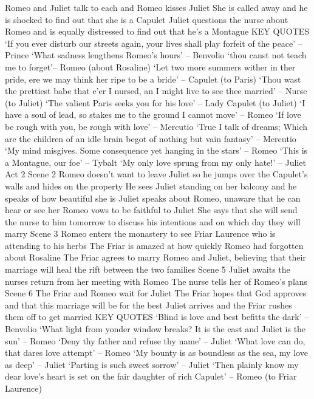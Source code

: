 \documentclass{article}
\begin{document}
\begin{outline}
\3 Romeo and Juliet talk to each and Romeo kisses Juliet
\3 She is called away and he is shocked to find out that she is a Capulet
\3 Juliet questions the nurse about Romeo and is equally distressed to find out that he's a Montague
\3 KEY QUOTES
\4 `If you ever disturb our streets again, your lives shall play forfeit of the peace' -- Prince
\4 `What sadness lengthens Romeo's hours' -- Benvolio
\4 `thou canst not teach me to forget'-- Romeo (about Rosaline)
\4 `Let two more summers wither in ther pride, ere we may think her ripe to be a bride' -- Capulet (to Paris)
\4 `Thou wast the prettiest babe that e'er I nursed, an I might live to see thee married' -- Nurse (to Juliet)
\4 `The valient Paris seeks you for his love' -- Lady Capulet (to Juliet)
\4 `I have a soul of lead, so stakes me to the ground I cannot move' -- Romeo
\4 `If love be rough with you, be rough with love' -- Mercutio
\4 `True I talk of dreams; Which are the children of an idle brain begot of nothing but vain fantasy' -- Mercutio
\4 `My mind misgives. Some consequence yet hanging in the stars' -- Romeo
\4 `This is a Montague, our foe' -- Tybalt
\4 `My only love sprung from my only hate!' -- Juliet
\1 Act 2
\2 Scene 2
\3 Romeo doesn't want to leave Juliet so he jumps over the Capulet's walls and hides on the property
\3 He sees Juliet standing on her balcony and he speaks of how beautiful she is
\3 Juliet speaks about Romeo, unaware that he can hear or see her
\3 Romeo vows to be faithful to Juliet
\3 She says that she will send the nurse to him tomorrow to discuss his intentions and on which day they will marry
\2 Scene 3
\3 Romeo enters the monastery to see Friar Laurence who is attending to his herbs
\3 The Friar is amazed at how quickly Romeo had forgotten about Rosaline
\3 The Friar agrees to marry Romeo and Juliet, believing that their marriage will heal the rift between the two families
\2 Scene 5
\3 Juliet awaits the nurses return from her meeting with Romeo
\3 The nurse tells her of Romeo's plans
\2 Scene 6
\3 The Friar and Romeo wait for Juliet
\3 The Friar hopes that God approves and that this marriage will be for the best
\3 Juliet arrives and the Friar rushes them off to get married
\2 KEY QUOTES
\3 `Blind is love and best befitts the dark' -- Benvolio
\3 `What light from yonder window breaks? It is the east and Juliet is the sun' -- Romeo
\3 `Deny thy father and refuse thy name' -- Juliet
\3 `What love can do, that dares love attempt' -- Romeo
\3 `My bounty is as boundless as the sea, my love as deep' -- Juliet
\3 `Parting is such sweet sorrow' -- Juliet
\3 `Then plainly know my dear love's heart is set on the fair daughter of rich Capulet' -- Romeo (to Friar Laurence)

\end{outline}
\end{document}
